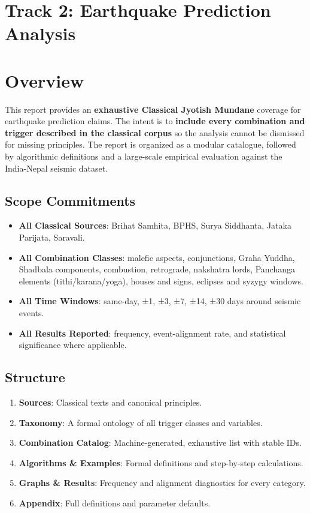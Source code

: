 \documentclass[
  11pt,
  a4paper,
  oneside,
  openany]{report}
\providecommand{\tightlist}{%
  \setlength{\itemsep}{0pt}\setlength{\parskip}{0pt}}\usepackage{longtable,booktabs,array}
\begin{document}
\chapter{Track 2: Earthquake Prediction
Analysis}\label{track-2-earthquake-prediction-analysis}

\chapter{Overview}\label{overview}

This report provides an \textbf{exhaustive Classical Jyotish Mundane}
coverage for earthquake prediction claims. The intent is to
\textbf{include every combination and trigger described in the classical
corpus} so the analysis cannot be dismissed for missing principles. The
report is organized as a modular catalogue, followed by algorithmic
definitions and a large-scale empirical evaluation against the
India-Nepal seismic dataset.

\section{Scope Commitments}\label{scope-commitments}

\begin{itemize}
\tightlist
\item
  \textbf{All Classical Sources}: Brihat Samhita, BPHS, Surya Siddhanta,
  Jataka Parijata, Saravali.
\item
  \textbf{All Combination Classes}: malefic aspects, conjunctions, Graha
  Yuddha, Shadbala components, combustion, retrograde, nakshatra lords,
  Panchanga elements (tithi/karana/yoga), houses and signs, eclipses and
  syzygy windows.
\item
  \textbf{All Time Windows}: same-day, ±1, ±3, ±7, ±14, ±30 days around
  seismic events.
\item
  \textbf{All Results Reported}: frequency, event-alignment rate, and
  statistical significance where applicable.
\end{itemize}

\section{Structure}\label{structure}

\begin{enumerate}
\def\labelenumi{\arabic{enumi}.}
\tightlist
\item
  \textbf{Sources}: Classical texts and canonical principles.
\item
  \textbf{Taxonomy}: A formal ontology of all trigger classes and
  variables.
\item
  \textbf{Combination Catalog}: Machine-generated, exhaustive list with
  stable IDs.
\item
  \textbf{Algorithms \& Examples}: Formal definitions and step-by-step
  calculations.
\item
  \textbf{Graphs \& Results}: Frequency and alignment diagnostics for
  every category.
\item
  \textbf{Appendix}: Full definitions and parameter defaults.
\end{enumerate}
\end{document}
